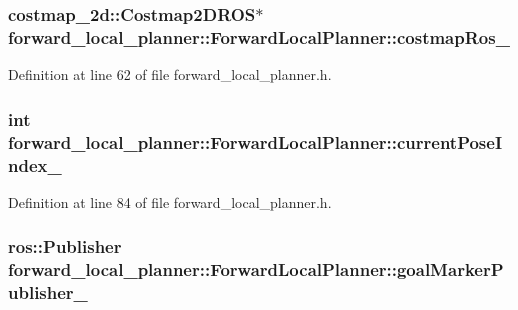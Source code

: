 \subsubsection[{\texorpdfstring{costmap\+Ros\+\_\+}{costmapRos_}}]{\setlength{\rightskip}{0pt plus 5cm}costmap\+\_\+2d\+::\+Costmap2\+D\+R\+OS$\ast$ forward\+\_\+local\+\_\+planner\+::\+Forward\+Local\+Planner\+::costmap\+Ros\+\_\+\hspace{0.3cm}{\ttfamily [private]}}\hypertarget{classforward__local__planner_1_1ForwardLocalPlanner_a2c232a05866edf1b71003188a03fc0c5}{}\label{classforward__local__planner_1_1ForwardLocalPlanner_a2c232a05866edf1b71003188a03fc0c5}


Definition at line 62 of file forward\+\_\+local\+\_\+planner.\+h.

\subsubsection[{\texorpdfstring{current\+Pose\+Index\+\_\+}{currentPoseIndex_}}]{\setlength{\rightskip}{0pt plus 5cm}int forward\+\_\+local\+\_\+planner\+::\+Forward\+Local\+Planner\+::current\+Pose\+Index\+\_\+\hspace{0.3cm}{\ttfamily [private]}}\hypertarget{classforward__local__planner_1_1ForwardLocalPlanner_a38a9662e8603f91d372759331b152077}{}\label{classforward__local__planner_1_1ForwardLocalPlanner_a38a9662e8603f91d372759331b152077}


Definition at line 84 of file forward\+\_\+local\+\_\+planner.\+h.

\subsubsection[{\texorpdfstring{goal\+Marker\+Publisher\+\_\+}{goalMarkerPublisher_}}]{\setlength{\rightskip}{0pt plus 5cm}ros\+::\+Publisher forward\+\_\+local\+\_\+planner\+::\+Forward\+Local\+Planner\+::goal\+Marker\+Publisher\+\_\+\hspace{0.3cm}{\ttfamily [private]}}\hypertarget{classforward__local__planner_1_1ForwardLocalPlanner_aa0248e082872c2e4f594269e5a785188}{}\label{classforward__local__planner_1_1ForwardLocalPlanner_aa0248e082872c2e4f594269e5a785188}


